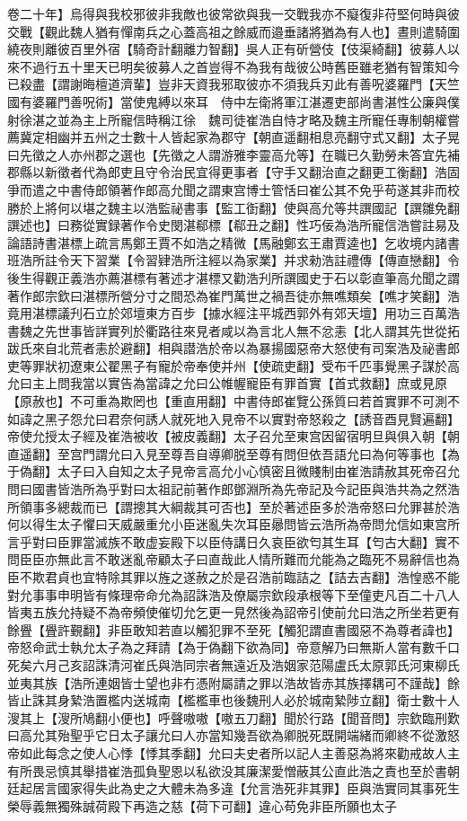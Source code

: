 卷二十年】烏得與我校邪彼非我敵也彼常欲與我一交戰我亦不癡復非苻堅何時與彼交戰【觀此魏人猶有憚南兵之心蓋高祖之餘威而邉垂諸將猶為有人也】晝則遣騎圍繞夜則離彼百里外宿【騎奇計翻離力智翻】吳人正有斫營伎【伎渠綺翻】彼募人以來不過行五十里天已明矣彼募人之首豈得不為我有哉彼公時舊臣雖老猶有智策知今已殺盡【謂謝晦檀道濟輩】豈非天資我邪取彼亦不須我兵刃此有善呪婆羅門【天竺國有婆羅門善呪術】當使鬼縛以來耳　侍中左衛將軍江湛遷吏部尚書湛性公廉與僕射徐湛之並為主上所寵信時稱江徐　魏司徒崔浩自恃才略及魏主所寵任專制朝權嘗薦冀定相幽并五州之士數十人皆起家為郡守【朝直遥翻相息亮翻守式又翻】太子晃曰先徵之人亦州郡之選也【先徵之人謂游雅李靈高允等】在職已久勤勞未答宜先補郡縣以新徵者代為郎吏且守令治民宜得更事者【守手又翻治直之翻更工衡翻】浩固爭而遣之中書侍郎領著作郎高允聞之謂東宫博士管恬曰崔公其不免乎苟遂其非而校勝於上將何以堪之魏主以浩監祕書事【監工衘翻】使與高允等共譔國記【譔雛免翻譔述也】曰務從實録著作令史閔湛郗標【郗丑之翻】性巧佞為浩所寵信浩嘗註易及論語詩書湛標上疏言馬鄭王賈不如浩之精微【馬融鄭玄王肅賈逵也】乞收境内諸書班浩所註令天下習業【令習肄浩所注經以為家業】并求勑浩註禮傳【傳直戀翻】令後生得觀正義浩亦薦湛標有著述才湛標又勸浩刋所譔國史于石以彰直筆高允聞之謂著作郎宗欽曰湛標所營分寸之間恐為崔門萬世之禍吾徒亦無噍類矣【噍才笑翻】浩竟用湛標議刋石立於郊壇東方百步【據水經注平城西郭外有郊天壇】用功三百萬浩書魏之先世事皆詳實列於衢路往來見者咸以為言北人無不忿恚【北人謂其先世從拓跋氏來自北荒者恚於避翻】相與譛浩於帝以為暴揚國惡帝大怒使有司案浩及祕書郎吏等罪狀初遼東公翟黑子有寵於帝奉使并州【使疏吏翻】受布千匹事覺黑子謀於高允曰主上問我當以實告為當諱之允曰公帷幄寵臣有罪首實【首式救翻】庶或見原【原赦也】不可重為欺罔也【重直用翻】中書侍郎崔覽公孫質曰若首實罪不可測不如諱之黑子怨允曰君奈何誘人就死地入見帝不以實對帝怒殺之【誘音酉見賢遍翻】帝使允授太子經及崔浩被收【被皮義翻】太子召允至東宫因留宿明旦與俱入朝【朝直遥翻】至宫門謂允曰入見至尊吾自導卿脱至尊有問但依吾語允曰為何等事也【為于偽翻】太子曰入自知之太子見帝言高允小心慎密且微賤制由崔浩請赦其死帝召允問曰國書皆浩所為乎對曰太祖記前著作郎鄧淵所為先帝記及今記臣與浩共為之然浩所領事多總裁而已【謂摠其大綱裁其可否也】至於著述臣多於浩帝怒曰允罪甚於浩何以得生太子懼曰天威嚴重允小臣迷亂失次耳臣曏問皆云浩所為帝問允信如東宫所言乎對曰臣罪當滅族不敢虚妄殿下以臣侍講日久哀臣欲匄其生耳【匄古大翻】實不問臣臣亦無此言不敢迷亂帝顧太子曰直哉此人情所難而允能為之臨死不易辭信也為臣不欺君貞也宜特除其罪以旌之遂赦之於是召浩前臨詰之【詰去吉翻】浩惶惑不能對允事事申明皆有條理帝命允為詔誅浩及僚屬宗欽段承根等下至僮吏凡百二十八人皆夷五族允持疑不為帝頻使催切允乞更一見然後為詔帝引使前允曰浩之所坐若更有餘舋【舋許覲翻】非臣敢知若直以觸犯罪不至死【觸犯謂直書國惡不為尊者諱也】帝怒命武士執允太子為之拜請【為于偽翻下欲為同】帝意解乃曰無斯人當有數千口死矣六月己亥詔誅清河崔氏與浩同宗者無遠近及浩姻家范陽盧氏太原郭氏河東柳氏並夷其族【浩所連姻皆士望也非冇憑附屬請之罪以浩故皆赤其族擇耦可不謹哉】餘皆止誅其身縶浩置檻内送城南【檻檻車也後魏刑人必於城南縶陟立翻】衛士數十人溲其上【溲所鳩翻小便也】呼聲嗷嗷【嗷五刀翻】聞於行路【聞音問】宗欽臨刑歎曰高允其殆聖乎它日太子讓允曰人亦當知幾吾欲為卿脱死既開端緒而卿終不從激怒帝如此每念之使人心悸【悸其季翻】允曰夫史者所以記人主善惡為將來勸戒故人主有所畏忌慎其舉措崔浩孤負聖恩以私欲没其廉潔愛憎蔽其公直此浩之責也至於書朝廷起居言國家得失此為史之大體未為多違【允言浩死非其罪】臣與浩實同其事死生榮辱義無獨殊誠荷殿下再造之慈【荷下可翻】違心苟免非臣所願也太子